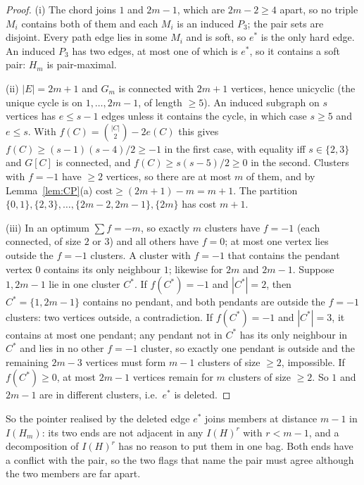 \begin{proof}
(i) The chord joins $1$ and $2m-1$, which are $2m-2\ge4$ apart, so no triple $M_i$ contains both of them and each $M_i$ is an induced $P_3$; the pair sets are disjoint. Every path edge lies in some $M_i$ and is soft, so $e^*$ is the only hard edge. An induced $P_3$ has two edges, at most one of which is $e^*$, so it contains a soft pair: $H_m$ is pair-maximal.

(ii) $|E|=2m+1$ and $G_m$ is connected with $2m+1$ vertices, hence unicyclic (the unique cycle is on $1,\dots,2m-1$, of length $\ge5$). An induced subgraph on $s$ vertices has $e\le s-1$ edges unless it contains the cycle, in which case $s\ge5$ and $e\le s$. With $f(C)=\binom{|C|}2-2e(C)$ this gives $f(C)\ge(s-1)(s-4)/2\ge-1$ in the first case, with equality iff $s\in\{2,3\}$ and $G[C]$ is connected, and $f(C)\ge s(s-5)/2\ge0$ in the second. Clusters with $f=-1$ have $\ge2$ vertices, so there are at most $m$ of them, and by Lemma~\ref{lem:CP}(a) $\mathrm{cost}\ge(2m+1)-m=m+1$. The partition $\{0,1\},\{2,3\},\dots,\{2m-2,2m-1\},\{2m\}$ has cost $m+1$.

(iii) In an optimum $\sum f=-m$, so exactly $m$ clusters have $f=-1$ (each connected, of size $2$ or $3$) and all others have $f=0$; at most one vertex lies outside the $f=-1$ clusters. A cluster with $f=-1$ that contains the pendant vertex $0$ contains its only neighbour $1$; likewise for $2m$ and $2m-1$. Suppose $1,2m-1$ lie in one cluster $C^*$. If $f(C^*)=-1$ and $|C^*|=2$, then $C^*=\{1,2m-1\}$ contains no pendant, and both pendants are outside the $f=-1$ clusters: two vertices outside, a contradiction. If $f(C^*)=-1$ and $|C^*|=3$, it contains at most one pendant; any pendant not in $C^*$ has its only neighbour in $C^*$ and lies in no other $f=-1$ cluster, so exactly one pendant is outside and the remaining $2m-3$ vertices must form $m-1$ clusters of size $\ge2$, impossible. If $f(C^*)\ge0$, at most $2m-1$ vertices remain for $m$ clusters of size $\ge2$. So $1$ and $2m-1$ are in different clusters, i.e.\ $e^*$ is deleted.
\end{proof}
So the pointer realised by the deleted edge $e^*$ joins members at distance $m-1$ in $I(H_m)$: its two ends are not adjacent in any $I(H)^r$ with $r<m-1$, and a decomposition of $I(H)^r$ has no reason to put them in one bag. Both ends have a conflict with the pair, so the two flags that name the pair must agree although the two members are far apart.

